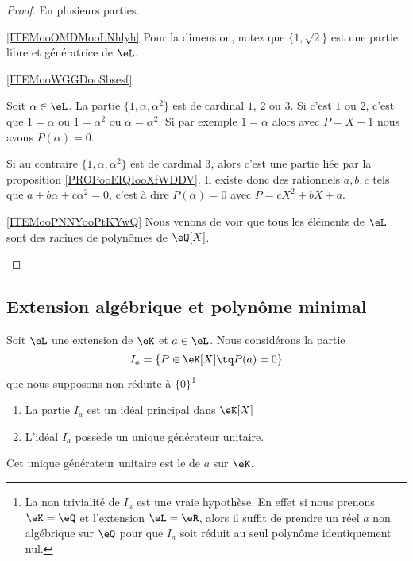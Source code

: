 \begin{proof}
    En plusieurs parties.
    \begin{subproof}
        \item[\ref{ITEMooOMDMooLNhlyh}]
            Pour la dimension, notez que \( \{ 1,\sqrt{ 2 } \}\) est une partie libre et génératrice de \( \eL\).

        \item[\ref{ITEMooWGGDooSbsesf}]

            Soit \( \alpha\in \eL\). La partie \( \{ 1,\alpha,\alpha^2 \}\) est de cardinal \( 1\), \( 2\) ou \( 3\). Si c'est \( 1\) ou \( 2\), c'est que \( 1=\alpha\) ou \( 1=\alpha^2\) ou \( \alpha=\alpha^2\). Si par exemple \( 1=\alpha\) alors avec \( P=X-1\) nous avons \( P(\alpha)=0\).

            Si au contraire \( \{ 1,\alpha,\alpha^2 \}\) est de cardinal \( 3\), alors c'est une partie liée par la proposition \ref{PROPooEIQIooXfWDDV}. Il existe donc des rationnels \( a,b,c\) tels que \( a+b\alpha+c\alpha^2=0\), c'est à dire \( P(\alpha)=0\) avec \( P=cX^2+bX+a\).
        \item[\ref{ITEMooPNNYooPtKYwQ}]
            Nous venons de voir que tous les éléments de \( \eL\) sont des racines de polynômes de \( \eQ[X]\).
    \end{subproof}
\end{proof}

\subsection{Extension algébrique et polynôme minimal}

\begin{lemmaDef}    \label{DefCVMooFGSAgL}
    Soit \( \eL\) une extension de \( \eK\) et \( a\in \eL\). Nous considérons la partie
    \begin{equation}
        I_a=\{ P\in \eK[X]\tq P(a)=0 \}
    \end{equation}
    que nous supposons non réduite à \( \{ 0 \}\)\footnote{La non trivialité de \( I_a\) est une vraie hypothèse. En effet si nous prenons \( \eK=\eQ\) et l'extension \( \eL=\eR\), alors il suffit de prendre un réel \( a\) non algébrique sur \( \eQ\) pour que \( I_a\) soit réduit au seul polynôme identiquement nul.}

    \begin{enumerate}
        \item
            La partie \( I_a\) est un idéal principal dans \( \eK[X]\)
        \item
            L'idéal \( I_a\) possède un unique générateur unitaire.
    \end{enumerate}

    Cet unique générateur unitaire est le  de \( a\) sur \( \eK\).
\end{lemmaDef}

